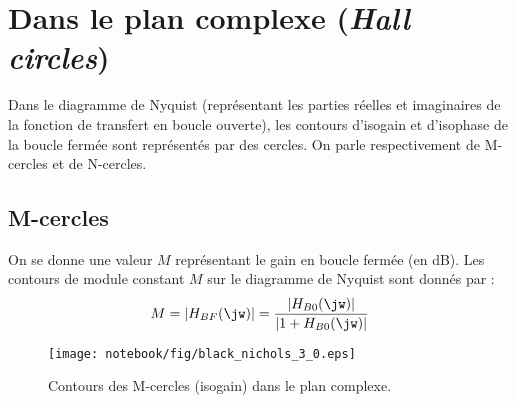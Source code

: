 \section{Dans le plan complexe (\emph{Hall circles})}
Dans le diagramme de Nyquist (représentant les parties réelles et imaginaires de 
la fonction de transfert en boucle ouverte), les contours d'isogain et 
d'isophase de la boucle fermée sont représentés par des cercles. 
On parle respectivement de M-cercles et de N-cercles. 
\subsection{M-cercles}
On se donne une valeur $M$ représentant le gain en boucle fermée (en \si{\dB}). 
Les contours de module constant $M$ sur le diagramme de Nyquist 
sont donnés par :
\[
    M=|H_{BF}(\jw)|=\dfrac{|H_{B0}(\jw)|}{|1+H_{B0}(\jw)|}
\]
\begin{figure}[!h]
\begin{center}
    \texttt{[image: notebook/fig/black\_nichols\_3\_0.eps]}
\end{center}
    \caption{Contours des M-cercles (isogain) dans le plan complexe.}
\end{figure}
